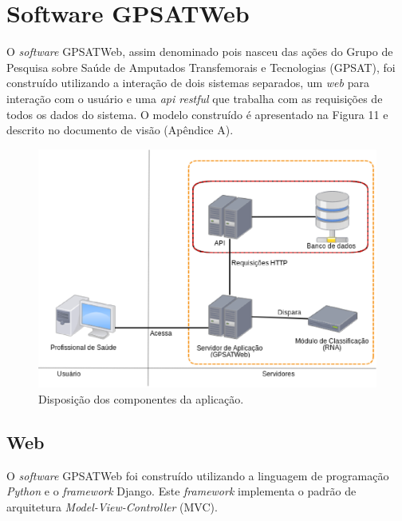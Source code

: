 \section{Software GPSATWeb}
    O \textit{software} GPSATWeb, assim denominado pois nasceu das ações do Grupo de Pesquisa sobre Saúde de Amputados Transfemorais e Tecnologias (GPSAT), foi construído utilizando a interação de dois sistemas separados, um \textit{web} para interação com o usuário e uma \textit{api restful} que trabalha com as requisições de todos os dados do sistema. O modelo construído é apresentado na Figura 11 e descrito no documento de visão (Apêndice A). 

     \begin{figure}[ht]
        \centering
        \label{fig11}
            \includegraphics[keepaspectratio=true, scale=0.6]{editaveis/images/arquiteturaGPSATWeb.eps}
        \caption{Disposição dos componentes da aplicação.}
    \end{figure}

    \subsection{Web}
        O \textit{software} GPSATWeb foi construído utilizando a linguagem de programação \textit{Python} e o \textit{framework} Django. Este \textit{framework} implementa o padrão de arquitetura \textit{Model-View-Controller} (MVC).

